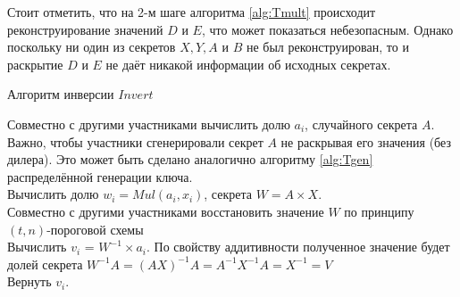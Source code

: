 \documentclass[a4paper,12pt]{article}
\theoremstyle{definition}
\begin{document}
		Стоит отметить, что на 2-м шаге алгоритма \ref{alg:Tmult} происходит реконструирование значений $D$ и $E$, что может показаться небезопасным. Однако поскольку ни один из секретов $X, Y, A$ и $B$ не был реконструирован, то и раскрытие $D$ и $E$ не даёт никакой информации об исходных секретах.
		
		\begin{algorithm}
			\caption{Алгоритм инверсии $Invert$}
			\label{alg:Tinv}
			
			
			
			Совместно с другими участниками вычислить долю $a_i$, случайного секрета $A$. Важно, чтобы участники сгенерировали секрет $A$ не раскрывая его значения (без дилера).
			Это может быть сделано аналогично алгоритму \ref{alg:Tgen} распределённой генерации ключа. 
			\\Вычислить долю $w_i = Mul(a_i, x_i)$, секрета $W=A\times X$.
			\\Совместно с другими участниками восстановить значение $W$ по принципу $(t, n)$-пороговой схемы 
			\\Вычислить $v_i$ = $W^{-1}\times a_i$. \linebreak
			По свойству аддитивности полученное значение будет долей секрета 
			$W^{-1} A = (A X)^{-1}A = A^{-1} X^{-1} A = X^{-1} = V$
			\\Вернуть $v_i$.
			
			
		\end{algorithm}	
	
	
\end{document}
